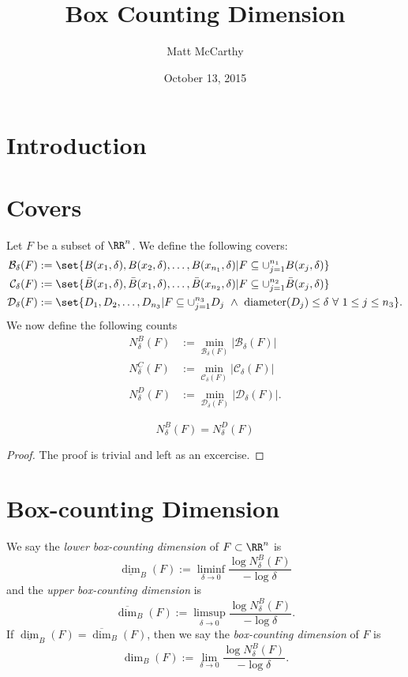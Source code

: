 \documentclass[notitlepage,12pt]{paper}
\title{Box Counting Dimension}
\date{October 13, 2015}
\author{Matt McCarthy}
\def\mcb{\mathcal{B}}
\def\mcc{\mathcal{C}}
\def\mcd{\mathcal{D}}
\def\diam{\operatorname{diameter}}
\def\dim{\operatorname{dim}}
\def\diml{\underline{\dim}}
\def\dimu{\overline{\dim}}
\begin{document}
\maketitle

\section{Introduction}

\section{Covers}

Let $F$ be a subset of $\RR^n$.
We define the following covers:
\begin{align*}
	\mcb_\delta(F)&:=\set{B(x_1,\delta),B(x_2,\delta),\ldots,B(x_{n_1},\delta)| F\subseteq \cup_{j=1}^{n_1} B(x_j,\delta)}\\
	\mcc_\delta(F)&:=\set{\bar{B}(x_1,\delta),\bar{B}(x_1,\delta),\ldots,\bar{B}(x_{n_2},\delta)| F\subseteq \cup_{j=1}^{n_2} \bar{B}(x_j,\delta)}\\
	\mcd_\delta(F)&:=\set{D_1,D_2,\ldots, D_{n_3}| F\subseteq \cup_{j=1}^{n_3} D_j \,\,\wedge\,\, \diam(D_j)\leq\delta\,\, \forall\,\, 1\leq j\leq n_3}.
\end{align*}
We now define the following counts
\begin{align*}
	N^B_\delta(F)&:=\min\limits_{\mcb_\delta(F)}|\mcb_\delta(F)|\\
	N^C_\delta(F)&:=\min\limits_{\mcc_\delta(F)}|\mcc_\delta(F)|\\
	N^D_\delta(F)&:=\min\limits_{\mcd_\delta(F)}|\mcd_\delta(F)|.
\end{align*}

\begin{thm}
	\[
		N^B_\delta(F)=N^D_\delta(F)
	\]
\end{thm}
\begin{proof}
	The proof is trivial and left as an excercise.
\end{proof}

\section{Box-counting Dimension}

\begin{defn}
	We say the \textit{lower box-counting dimension} of $F\subset\RR^n$ is
	\[
		\diml_B(F):=\liminf\limits_{\delta\rightarrow 0} \frac{\log N^B_\delta(F)}{-\log\delta}
	\]
	and the \textit{upper box-counting dimension} is
	\[
		\dimu_B(F):=\limsup\limits_{\delta\rightarrow 0} \frac{\log N^B_\delta(F)}{-\log\delta}.
	\]
	If $\diml_B(F)=\dimu_B(F)$, then we say the \textit{box-counting dimension} of $F$ is
	\[
		\dim_B(F):=\lim\limits_{\delta\rightarrow 0} \frac{\log N^B_\delta(F)}{-\log\delta}.
	\]
\end{defn}
\end{document}
